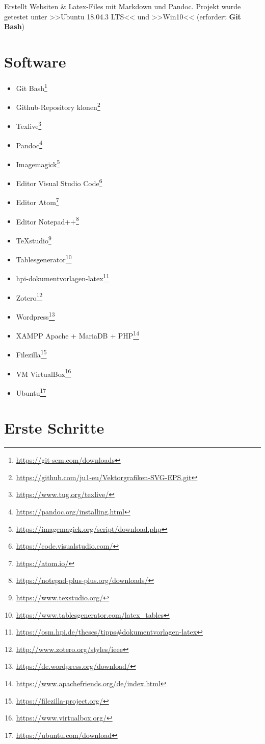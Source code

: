 Erstellt Websiten \& Latex-Files mit Markdown und Pandoc. Projekt wurde
getestet unter >>Ubuntu 18.04.3 LTS<< und >>Win10<< (erfordert
\textbf{Git Bash})

\section{Software}\label{software}

\begin{itemize}
\item
  Git Bash\footnote{\url{https://git-scm.com/downloads}}
\item
  Github-Repository klonen\footnote{\url{https://github.com/ju1-eu/Vektorgrafiken-SVG-EPS.git}}
\item
  Texlive\footnote{\url{https://www.tug.org/texlive/}}
\item
  Pandoc\footnote{\url{https://pandoc.org/installing.html}}
\item
  Imagemagick\footnote{\url{https://imagemagick.org/script/download.php}}
\item
  Editor Visual Studio Code\footnote{\url{https://code.visualstudio.com/}}
\item
  Editor Atom\footnote{\url{https://atom.io/}}
\item
  Editor Notepad++\footnote{\url{https://notepad-plus-plus.org/downloads/}}
\item
  TeXstudio\footnote{\url{https://www.texstudio.org/}}
\item
  Tablesgenerator\footnote{\url{https://www.tablesgenerator.com/latex_tables}}
\item
  hpi-dokumentvorlagen-latex\footnote{\url{https://osm.hpi.de/theses/tipps\#dokumentvorlagen-latex}}
\item
  Zotero\footnote{\url{http://www.zotero.org/styles/ieee}}
\item
  Wordpress\footnote{\url{https://de.wordpress.org/download/}}
\item
  XAMPP Apache + MariaDB + PHP\footnote{\url{https://www.apachefriends.org/de/index.html}}
\item
  Filezilla\footnote{\url{https://filezilla-project.org/}}
\item
  VM VirtualBox\footnote{\url{https://www.virtualbox.org/}}
\item
  Ubuntu\footnote{\url{https://ubuntu.com/download}}
\end{itemize}

\section{Erste Schritte}\label{erste-schritte}

